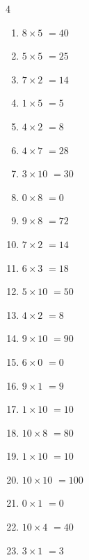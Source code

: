 \begin{multicols}{4}
\begin{enumerate}
  \item $8\times 5$
        $=40$

  \item $5\times 5$
        $=25$

  \item $7\times 2$
        $=14$

  \item $1\times 5$
        $=5$

  \item $4\times 2$
        $=8$

  \item $4\times 7$
        $=28$

  \item $3\times 10$
        $=30$

  \item $0\times 8$
        $=0$

  \item $9\times 8$
        $=72$

  \item $7\times 2$
        $=14$

  \item $6\times 3$
        $=18$

  \item $5\times 10$
        $=50$

  \item $4\times 2$
        $=8$

  \item $9\times 10$
        $=90$

  \item $6\times 0$
        $=0$

  \item $9\times 1$
        $=9$

  \item $1\times 10$
        $=10$

  \item $10\times 8$
        $=80$

  \item $1\times 10$
        $=10$

  \item $10\times 10$
        $=100$

\columnbreak %

  \item $0\times 1$
        $=0$

  \item $10\times 4$
        $=40$

  \item $3\times 1$
        $=3$


\end{enumerate}
\end{multicols}
